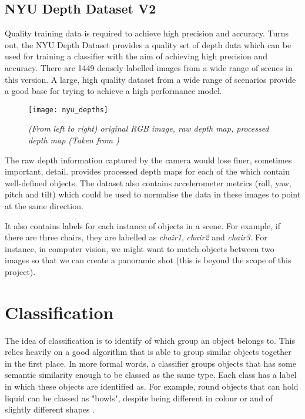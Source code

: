 
\subsection{NYU Depth Dataset V2 \protect\cite{nyu-dataset}}
Quality training data is required to achieve high precision and accuracy. Turns out, the NYU Depth Dataset provides a quality set of depth data which can be used for training a classifier with the aim of achieving high precision and accuracy. There are 1449 densely labelled images from a wide range of scenes in this version. A large, high quality dataset from a wide range of scenarios provide a good base for trying to achieve a high performance model.

\begin{figure}[h]
  \centering
  \texttt{[image: nyu\_depths]}
  \caption{\textit{(From left to right) original RGB image, raw depth map, processed depth map (Taken from \protect{})}}
  \label{fig:nyu_depths}
\end{figure}

The raw depth information captured by the camera would lose finer, sometimes important, detail.  provides processed depth maps for each of the which contain well-defined objects. The dataset also contains accelerometer metrics (roll, yaw, pitch and tilt) which could be used to normalise the data in these images to point at the same direction.

It also contains labels for each instance of objects in a scene. For example, if there are three chairs, they are labelled as \textit{chair1}, \textit{chair2} and \textit{chair3}. For instance, in computer vision, we might want to match objects between two images so that we can create a panoramic shot (this is beyond the scope of this project).


\newpage

\section{Classification} \label{sec:classification}
The idea of classification is to identify of which group an object belongs to. This relies heavily on a good algorithm that is able to group similar objects together in the first place. In more formal words, a classifier groups objects that has some semantic similarity enough to be classed as the same type. Each class has a label in which these objects are identified as. For example, round objects that can hold liquid can be classed as "bowls", despite being different in colour or and of slightly different shapes \cite{hall-notes}. 


